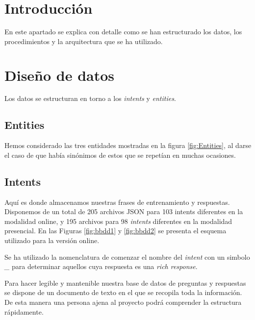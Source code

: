 
\section{Introducción}

En este apartado se explica con detalle como se han estructurado los datos, los procedimientos y la arquitectura que se ha utilizado.

\section{Diseño de datos}

Los datos se estructuran en torno a los \textit{intents} y \textit{entities}.

\subsection{Entities}

Hemos considerado las tres entidades mostradas en la figura \ref{fig:Entities}, al darse el caso de que había sinónimos de estos que se repetían en muchas ocasiones.


\subsection{Intents}

Aquí es donde almacenamos nuestras frases de entrenamiento y respuestas. Disponemos de un total de 205 archivos JSON para 103 intents diferentes en la modalidad online, y 195 archivos para 98 \textit{intents} diferentes en la modalidad presencial. En las Figuras \ref{fig:bbdd1} y \ref{fig:bbdd2} se presenta el esquema utilizado para la versión online.



Se ha utilizado la nomenclatura de comenzar el nombre del \textit{intent} con un simbolo \textit{\_} para determinar aquellos cuya respuesta es una \textit{rich response}.

\newpage
Para hacer legible y mantenible nuestra base de datos de preguntas y respuestas se dispone de un documento de texto en el que se recopila toda la información. De esta manera una persona ajena al proyecto podrá comprender la estructura rápidamente.


